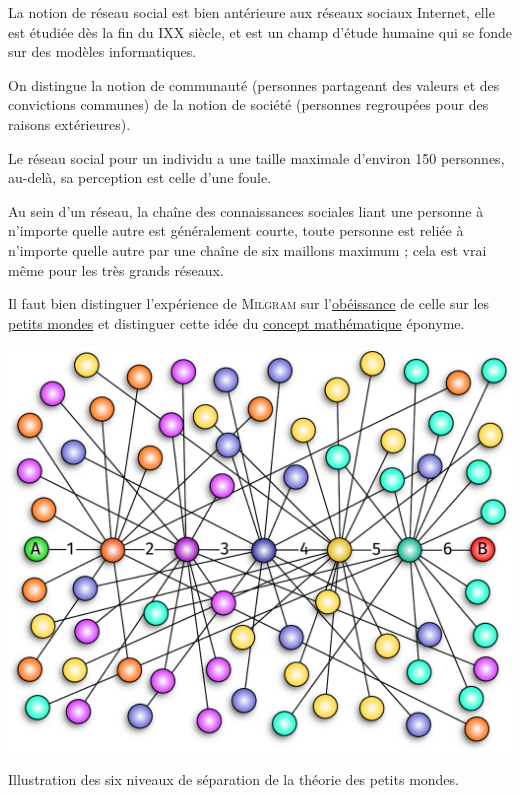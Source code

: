 \begin{jazzitemize}
\item La notion de réseau social est bien antérieure aux réseaux sociaux Internet,  elle est étudiée dès la fin du IXX siècle, et est un champ d'étude humaine qui se fonde sur des modèles informatiques.
\item On distingue la notion de communauté (personnes partageant des valeurs et des convictions communes) de la notion de société (personnes regroupées pour des raisons extérieures).
\item Le réseau social pour un individu a une taille maximale d'environ 150 personnes,  au-delà, sa perception est celle d'une foule.
\item Au sein d'un réseau, la chaîne des connaissances sociales liant une personne à n'importe quelle autre est généralement courte, toute personne est reliée à n'importe quelle autre par une chaîne de six maillons maximum ; cela est vrai même pour les très grands réseaux.
\item Il faut bien distinguer l'expérience de \textsc{Milgram} sur l'\href{https://fr.wikipedia.org/wiki/Exp\%C3\%A9rience_de_Milgram}{obéissance} de celle sur les \href{https://fr.wikipedia.org/wiki/\%C3\%89tude_du_petit_monde\#Exp\%C3\%A9riences_men\\%C3\%A9es_par_Milgram}{petits mondes} et distinguer cette idée du \href{https://fr.wikipedia.org/wiki/R\%C3\%A9seau_\%C2\%AB_petit_monde_\%C2\%BB}{concept mathématique} éponyme.
\end{jazzitemize}

\begin{margingraphic}{-20pt}
\includegraphics[width=\linewidth]{./Images/Chapter09/milgram-six-degrees-of-separation.pdf}
\caption{Illustration des six niveaux de séparation de la théorie des petits mondes.}
\end{margingraphic}



